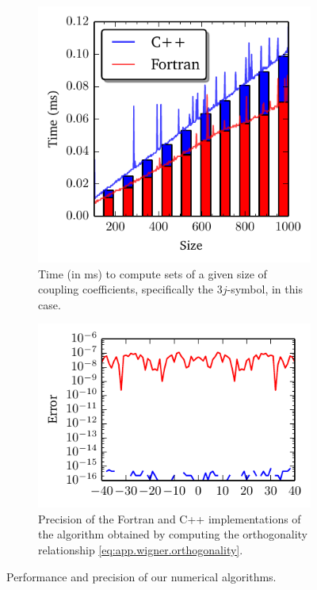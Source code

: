 \begin{figure}
 \centering
 \begin{subfigure}[b]{0.5\textwidth}
  \includegraphics[width=\textwidth]{figs/backmatter/wignerTimes.pdf}
  \caption{Time (in ms) to compute sets of a given size of coupling coefficients, specifically the 
	    $3j$-symbol, in this case.}
 \end{subfigure}\hfill
 \begin{subfigure}[b]{0.5\textwidth}
  \includegraphics[width=\textwidth]{figs/backmatter/wignerPrecision.pdf}
  \caption{Precision of the Fortran and C++ implementations of the algorithm obtained%
	    by computing the orthogonality relationship \eqref{eq:app.wigner.orthogonality}.}
 \end{subfigure}
 \caption{Performance and precision of our numerical algorithms.}
\end{figure}

